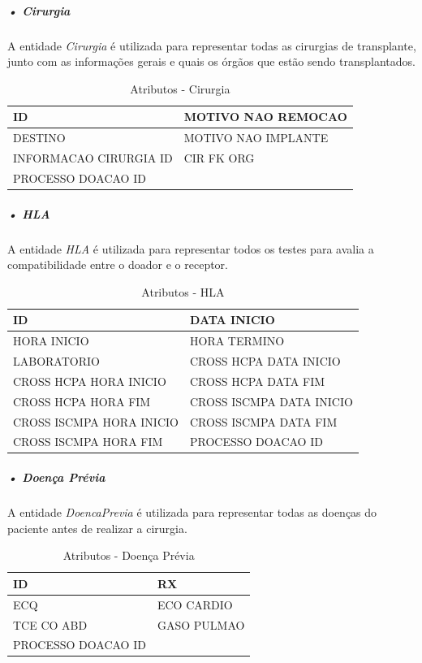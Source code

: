 \documentclass[portuguese,oneside]{tcc}
\begin{document}
\subparagraph{• Cirurgia}
A entidade \textit{Cirurgia} é utilizada para representar todas as cirurgias  de transplante, junto com as informações gerais e quais os órgãos que estão sendo transplantados.

\begin{table}
\centering
\caption{Atributos - Cirurgia} \label{table:cirurgia}
\begin{tabular}{ |p{6cm}|p{6cm}| }

\hline
ID & MOTIVO NAO REMOCAO\\
\hline
DESTINO & MOTIVO NAO IMPLANTE\\
\hline
INFORMACAO CIRURGIA ID & CIR FK ORG\\
\hline
PROCESSO DOACAO ID &\\
\hline

\end{tabular}
\end{table}

\subparagraph{• HLA}
A entidade \textit{HLA} é utilizada para representar todos os testes para avalia a compatibilidade entre o doador e o receptor.

\begin{table}
\centering
\caption{Atributos - HLA} \label{table:atr-hla}
\begin{tabular}{ |p{6cm}|p{6cm}| }

\hline
ID & DATA INICIO\\
\hline
HORA INICIO & HORA TERMINO\\
\hline
LABORATORIO & CROSS HCPA DATA INICIO\\
\hline
CROSS HCPA HORA INICIO & CROSS HCPA DATA FIM\\

\hline
CROSS HCPA HORA FIM & CROSS ISCMPA DATA INICIO\\
\hline
CROSS ISCMPA HORA INICIO & CROSS ISCMPA DATA FIM\\

\hline
CROSS ISCMPA HORA FIM & PROCESSO DOACAO ID\\
\hline

\end{tabular}
\end{table}

\subparagraph{• Doença Prévia}
A entidade \textit{DoencaPrevia} é utilizada para representar todas as doenças do paciente antes de realizar a cirurgia.

\begin{table}
\centering
\caption{Atributos - Doença Prévia} \label{table:doenca-previa}
\begin{tabular}{ |p{6cm}|p{6cm}| }

\hline
ID & RX\\
\hline
ECQ & ECO CARDIO\\
\hline
TCE CO ABD & GASO PULMAO\\
\hline
PROCESSO DOACAO ID &\\
\hline

\end{tabular}
\end{table}
\end{document}
